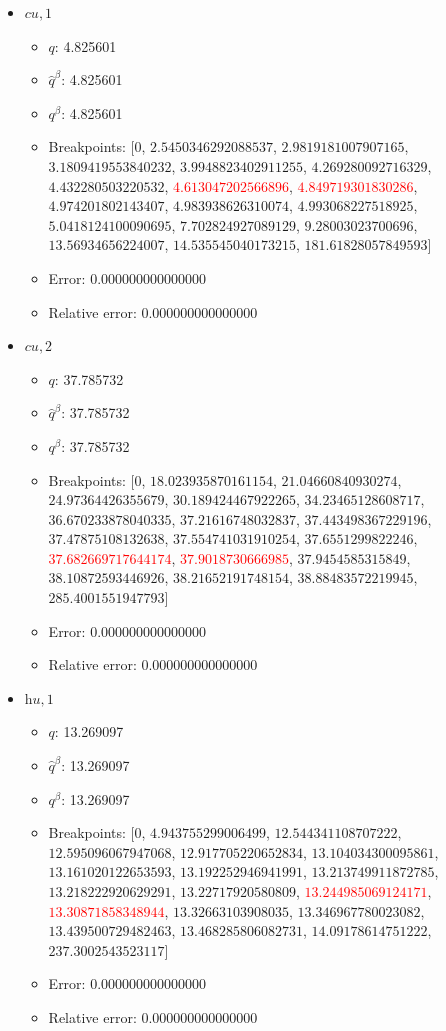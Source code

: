 \documentclass{article}%
\begin{document}
\begin{itemize}
\begin{itemize}
		\item Error: 0.000000000000000%
		\item Relative error: 0.000000000000000%
	\end{itemize}%
	\item $\textit{cu},1$%
	\begin{itemize}%
		\item $q$: 4.825601%
		\item $\hat{q}^\beta$: 4.825601%
		\item $q^\beta$: 4.825601%
		\item Breakpoints: $[$$0$, $2.5450346292088537$, $2.9819181007907165$, $3.1809419553840232$, $3.9948823402911255$, $4.269280092716329$, $4.432280503220532$, \textcolor{red}{$4.613047202566896$}, \textcolor{red}{$4.849719301830286$}, $4.974201802143407$, $4.983938626310074$, $4.993068227518925$, $5.0418124100090695$, $7.702824927089129$, $9.28003023700696$, $13.56934656224007$, $14.535545040173215$, $181.61828057849593$$]$%
		\item Error: 0.000000000000000%
		\item Relative error: 0.000000000000000%
	\end{itemize}%
	\item $\textit{cu},2$%
	\begin{itemize}%
		\item $q$: 37.785732%
		\item $\hat{q}^\beta$: 37.785732%
		\item $q^\beta$: 37.785732%
		\item Breakpoints: $[$$0$, $18.023935870161154$, $21.04660840930274$, $24.97364426355679$, $30.189424467922265$, $34.23465128608717$, $36.670233878040335$, $37.21616748032837$, $37.443498367229196$, $37.47875108132638$, $37.554741031910254$, $37.6551299822246$, \textcolor{red}{$37.682669717644174$}, \textcolor{red}{$37.9018730666985$}, $37.9454585315849$, $38.10872593446926$, $38.21652191748154$, $38.88483572219945$, $285.4001551947793$$]$%
		\item Error: 0.000000000000000%
		\item Relative error: 0.000000000000000%
	\end{itemize}%
	\item $\textit{hu},1$%
	\begin{itemize}%
		\item $q$: 13.269097%
		\item $\hat{q}^\beta$: 13.269097%
		\item $q^\beta$: 13.269097%
		\item Breakpoints: $[$$0$, $4.943755299006499$, $12.544341108707222$, $12.595096067947068$, $12.917705220652834$, $13.104034300095861$, $13.161020122653593$, $13.192252946941991$, $13.213749911872785$, $13.218222920629291$, $13.22717920580809$, \textcolor{red}{$13.244985069124171$}, \textcolor{red}{$13.30871858348944$}, $13.32663103908035$, $13.346967780023082$, $13.439500729482463$, $13.468285806082731$, $14.09178614751222$, $237.3002543523117$$]$%
		\item Error: 0.000000000000000%
		\item Relative error: 0.000000000000000%
	\end{itemize}%
\end{itemize}%
\end{document}
